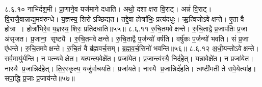 ८.६.१०
नाभि॑र्दश॒मी। प्रा॒णाने॒व यज॑माने दधाति। अथो॒ दशाक्षरा वि॒राट्। अन्नं॑  वि॒राट्। वि॒राजै॒वान्नाद्य॒मव॑रुन्धे। य॒ज्ञस्य॒ शिरोऽच्छिद्यत। तद्दे॒वा होत्रा॑भिः॒ प्रत्य॑दधुः। ऋ॒त्विजोऽवेक्षन्ते। ए॒ता वै होत्रा। होत्रा॑भिरे॒व य॒ज्ञस्य॒ शिरः॒ प्रति॑दधाति॥५५॥
८.६.११
रु॒चि॒तमवेक्षन्ते। रु॒चि॒ताद्वै प्र॒जाप॑तिः प्र॒जा अ॑सृजत। प्र॒जाना॒ सृष्ट्यै। रु॒चि॒तमवेक्षन्ते। रु॒चि॒ताद्वै प॒र्जन्यो॑ वर्\mbox{}षति। वर्\mbox{}षु॑कः प॒र्जन्यो॑ भवति। सं प्र॒जा ए॑धन्ते। रु॒चि॒तमवेक्षन्ते। रु॒चि॒तं वै ब्र॑ह्मवर्च॒सम्। ब्र॒ह्म॒व॒र्च॒सिनो॑ भवन्ति॥५६॥
८.६.१२
अ॒धी॒यन्तोऽवेक्षन्ते। सर्व॒मायु॑र्यन्ति। न पत्न्यवेक्षेत। यत्पन्त्य॒वेक्षे॑त। प्रजा॑येत। प्र॒जान्त्व॑स्यै॒ निर्द॑हेत्। यन्नावेक्षे॑त। न प्रजा॑येत। नास्यै प्र॒जान्निर्द॑हेत्। ति॒र॒स्कृत्य॒ यजु॑र्वाचयति। प्रजा॑यते। नास्यै प्र॒जान्निर्द॑हति। त्वष्टी॑मती ते सपे॒येत्या॑ह। सपा॒द्धि प्र॒जाः प्र॒जाय॑न्ते॥५७॥
\anuvakamend

